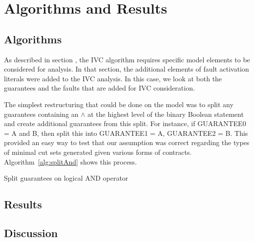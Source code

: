 \section{Algorithms and Results}

\subsection{Algorithms}
As described in section , the IVC algorithm requires specific model elements to be considered for analysis. In that section, the additional elements of fault activation literals were added to the IVC analysis. In this case, we look at both the guarantees and the faults that are added for IVC consideration. 

The simplest restructuring that could be done on the model was to split any guarantees containing an $\land$ at the highest level of the binary Boolean statement and create additional guarantees from this split. For instance, if GUARANTEE0 = A and B, then split this into GUARANTEE1 = A, GUARANTEE2 = B. This provided an easy way to test that our assumption was correct regarding the types of minimal cut sets generated given various forms of contracts. Algorithm~\ref{alg:splitAnd} shows this process. 

\begin{algorithm}[h]

	\caption{Split guarantees on logical AND operator}
	\label{alg:splitAnd}
\end{algorithm}

\subsection{Results}


\subsection{Discussion}